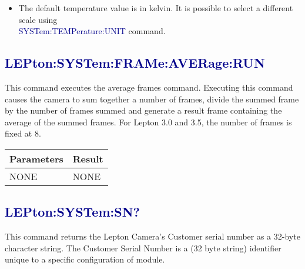 \documentclass[10pt,a4paper]{article}
\begin{document}
    \begin{itemize}
        \item The default temperature value is in kelvin. It is possible to select a different scale using \\ 
                \textcolor{darkblue}{SYSTem:TEMPerature:UNIT} command.
    \end{itemize}


\subsection*{\textcolor{darkblue}{LEPton:SYSTem:FRAMe:AVERage:RUN}}

\vspace{12pt}

This command executes the average frames command. Executing this command causes the camera to sum
together a number of frames, divide the summed frame by the number of frames summed and generate a result
frame containing the average of the summed frames. For Lepton 3.0 and 3.5, the number of frames is fixed at 8.

    \begin{table}[h]
        \centering
        \begin{tabularx}{\textwidth}{|X|X|}
            \hline
            \rowcolor{gray!30} 
            Parameters & Result \\
            \hline
            NONE &  NONE \\
            \hline
        \end{tabularx}
    \end{table}


\subsection*{\textcolor{darkblue}{LEPton:SYSTem:SN?}}

\vspace{12pt}

This command returns the Lepton Camera’s Customer serial number as a 32-byte character string. The Customer
Serial Number is a (32 byte string) identifier unique to a specific configuration of module.
\end{document}
